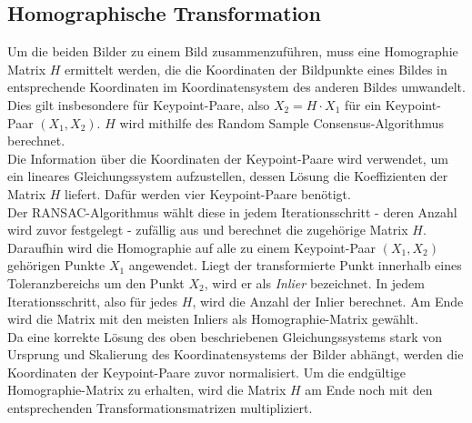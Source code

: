 \documentclass[deutsch]{scrartcl}
\begin{document}
\subsection{Homographische Transformation}
Um die beiden Bilder zu einem Bild zusammenzuführen, muss eine Homographie Matrix $H$ ermittelt werden, die die Koordinaten der Bildpunkte eines Bildes in entsprechende Koordinaten im Koordinatensystem des anderen Bildes umwandelt. Dies gilt insbesondere für Keypoint-Paare, also $X_2=H\cdot X_1$ für ein Keypoint-Paar $(X_1,X_2)$. $H$ wird mithilfe des Random Sample Consensus-Algorithmus\cite{dubrovsky09} berechnet.\\
Die Information über die Koordinaten der Keypoint-Paare wird verwendet, um ein lineares Gleichungssystem aufzustellen, dessen Lösung die Koeffizienten der Matrix $H$ liefert. Dafür werden vier Keypoint-Paare benötigt.\cite{kriegman07}\\
Der RANSAC-Algorithmus wählt diese in jedem Iterationsschritt - deren Anzahl wird zuvor festgelegt - zufällig aus und berechnet die zugehörige Matrix $H$. Daraufhin wird die Homographie auf alle zu einem Keypoint-Paar $(X_1,X_2)$ gehörigen Punkte $X_1$ angewendet. Liegt der transformierte Punkt innerhalb eines Toleranzbereichs um den Punkt $X_2$, wird er als \textit{Inlier} bezeichnet. In jedem Iterationsschritt, also für jedes $H$, wird die Anzahl der Inlier berechnet. Am Ende wird die Matrix mit den meisten Inliers als Homographie-Matrix gewählt.\\
Da eine korrekte Lösung des oben beschriebenen Gleichungssystems stark von Ursprung und Skalierung des Koordinatensystems der Bilder abhängt, werden die Koordinaten der Keypoint-Paare zuvor normalisiert. Um die endgültige Homographie-Matrix zu erhalten, wird die Matrix $H$ am Ende noch mit den entsprechenden Transformationsmatrizen multipliziert.\cite{dubrovsky09}
\end{document}
